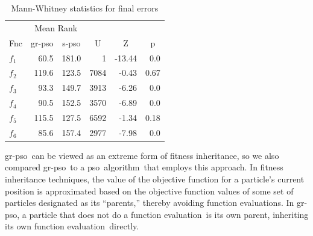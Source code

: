\documentclass[a4paper,twoside]{article}
\newcommand{\fe}{function evaluation}
\newcommand{\pso}{{\sc pso}}
\newcommand{\spso}{{\sc s-pso}}
\newcommand{\cfe}{{\sc gr-pso}}
\newcommand{\alg}{algorithm}
\begin{document}
\begin{table}
\begin{tabular}{|| l | r | r | r | r | r ||}

\hline \hline 

    &   \multicolumn{2}{c|}{Mean Rank}  & &  & \\
                                                                      \cline{2-3}
  Fnc   &     \multicolumn{1}{c|}{\cfe}           & \multicolumn{1}{c|}{\spso}    & \multicolumn{1}{c|}{U}         &   \multicolumn{1}{c|}{Z}     &    \multicolumn{1}{c||}{p}    \\

\hline \hline 

$f_1$       &  60.5              &  181.0      &   1    &  -13.44         &  0.0  \\

\hline

$f_2$     &  119.6              &  123.5     &   7084     &  -0.43         &  0.67  \\

\hline


$f_3$     &  93.3              &  149.7      &   3913    &  -6.26         &  0.0  \\

\hline

$f_4$     &  90.5              &  152.5      &   3570    &  -6.89         &  0.0  \\

\hline

$f_5$     &  115.5              &  127.5     &    6592    &  -1.34         &  0.18  \\

\hline

$f_6$     &  85.6              &  157.4      &   2977    &  -7.98         &  0.0  \\

\hline \hline


\end{tabular}
\caption{Mann-Whitney statistics for final errors }
\label{t:mann-whitney-data}
\end{table}




\cfe\ can be viewed as an extreme form of fitness inheritance, so we also compared \cfe\ to a \pso\ \alg\ that employs this approach. In fitness inheritance techniques, the value of the objective function for a particle's current position is approximated based on the objective function values of some set of particles designated as its ``parents,'' thereby avoiding function evaluations. In \cfe, a particle that does not do a \fe\ is its own parent, inheriting its own \fe\ directly.
\end{document}

